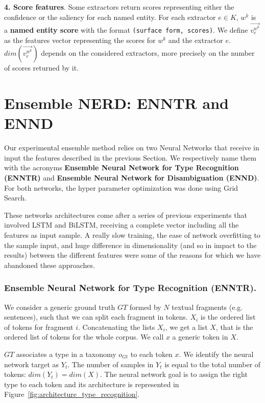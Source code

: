 \documentclass{llncs}
\begin{document}
\textbf{4. Score features}. Some extractors return scores representing either the confidence or the saliency for each named entity. For each extractor $e \in K$, $w^k$ is a \textbf{named entity score} with the format \texttt{(surface form, scores)}. 
We define $\vec{v^{w^{k}}_{e}}$ as the features vector representing the scores for $w^k$ and the extractor $e$.  $dim(\vec{v^{w^{k}}_{e}})$ depends on the considered extractors, more precisely on the number of scores returned by it.


\section{Ensemble NERD: ENNTR and ENND}
\label{sec:experiment}
Our experimental ensemble method relies on two Neural Networks that receive in input the features described in the previous Section. We respectively name them with the acronyms \textbf{Ensemble Neural Network for Type Recognition (ENNTR)} and \textbf{Ensemble Neural Network for Disambiguation (ENND)}. For both networks, the hyper parameter optimization was done using Grid Search.

These networks architectures come after a series of previous experiments that involved LSTM and BiLSTM, receiving a complete vector including all the features as input sample. A really slow training, the ease of network overfitting to the sample input, and huge difference in dimensionality (and so in impact to the results) between the different features were some of the reasons for which we have abandoned these approaches.

\subsubsection{Ensemble Neural Network for Type Recognition (ENNTR).}
We consider a generic ground truth $GT$ formed by $N$ textual fragments (e.g. sentences), such that we can split each fragment in tokens. $X_i$ is the ordered list of tokens for fragment $i$. Concatenating the lists $X_i$, we get a list $X$, that is the ordered list of tokens for the whole corpus. We call $x$ a generic token in $X$. 

$GT$ associates a type in a taxonomy $o_{Gt}$ to each token $x$. We identify the neural network target as $Y_t$. The number of samples in $Y_t$ is equal to the total number of tokens: $dim(Y_t)=dim(X)$. The neural network goal is to assign the right type to each token and its architecture is represented in Figure~\ref{fig:architecture_type_recognition}. 
\end{document}
